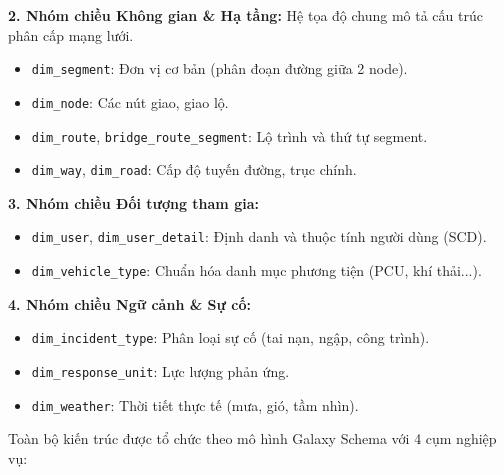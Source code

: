 \textbf{2. Nhóm chiều Không gian \& Hạ tầng:}
Hệ tọa độ chung mô tả cấu trúc phân cấp mạng lưới.
\begin{itemize}
    \item \texttt{dim\_segment}: Đơn vị cơ bản (phân đoạn đường giữa 2 node).
    \item \texttt{dim\_node}: Các nút giao, giao lộ.
    \item \texttt{dim\_route}, \texttt{bridge\_route\_segment}: Lộ trình và thứ tự segment.
    \item \texttt{dim\_way}, \texttt{dim\_road}: Cấp độ tuyến đường, trục chính.
\end{itemize}

\textbf{3. Nhóm chiều Đối tượng tham gia:}
\begin{itemize}
    \item \texttt{dim\_user}, \texttt{dim\_user\_detail}: Định danh và thuộc tính người dùng (SCD).
    \item \texttt{dim\_vehicle\_type}: Chuẩn hóa danh mục phương tiện (PCU, khí thải...).
\end{itemize}

\textbf{4. Nhóm chiều Ngữ cảnh \& Sự cố:}
\begin{itemize}
    \item \texttt{dim\_incident\_type}: Phân loại sự cố (tai nạn, ngập, công trình).
    \item \texttt{dim\_response\_unit}: Lực lượng phản ứng.
    \item \texttt{dim\_weather}: Thời tiết thực tế (mưa, gió, tầm nhìn).
\end{itemize}

Toàn bộ kiến trúc được tổ chức theo mô hình Galaxy Schema với 4 cụm nghiệp vụ:

